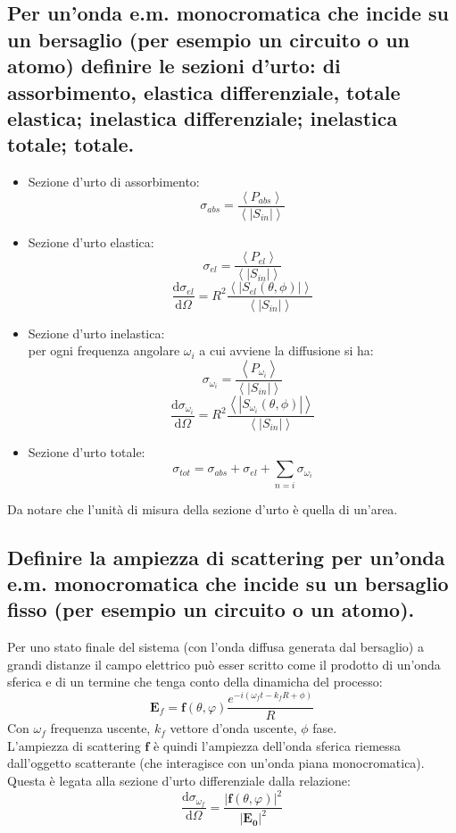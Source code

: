 \subsection[ Sezioni d'urto di onda E.M. su bersaglio]{Per un’onda e.m. monocromatica che incide su un bersaglio (per esempio un circuito o un atomo) definire le sezioni d’urto: di assorbimento, elastica differenziale, totale elastica; inelastica differenziale; inelastica totale; totale.}
\begin{itemize}
\item Sezione d'urto di assorbimento: 
	\[
		\sigma_{abs} = \frac{\left< P_{abs} \right> }{\left< \left|S_{in}\right| \right> }
	\] 	
\item Sezione d'urto elastica:
	\[
		\sigma_{el} = \frac{\left<P_{el} \right>}{\left< \left| S_{in} \right|  \right>} 
	\] 
	\[
		\frac{\mbox{d} \sigma_{el}}{\mbox{d} \Omega} = R^2 \frac{\left< \left| S_{el}\left( \theta,\phi \right)  \right|\right>}{ \left< \left| S_{in} \right|  \right> } 
	\] 
\item Sezione d'urto inelastica:\\
per ogni frequenza angolare $\omega_{i}$ a cui avviene la diffusione si ha:
\[
	\sigma_{\omega_{i}} = \frac{\left<P_{\omega_{i}} \right>}{\left< \left| S_{in} \right|  \right>} 
\] 
\[
	\frac{\mbox{d} \sigma_{\omega_{i}}}{\mbox{d} \Omega} = R^2 \frac{\left< \left| S_{\omega_{i}}\left( \theta,\phi \right)  \right|\right>}{ \left< \left| S_{in} \right|  \right> }
\] 
\item Sezione d'urto totale: 
	\[
	\sigma_{tot} = \sigma_{abs} + \sigma_{el} + \sum_{n=i} \sigma_{\omega_{i}}
	\] 
\end{itemize}
Da notare che l'unità di misura della sezione d'urto è quella di un'area.

\subsection[ Ampiezza di scattering]{Definire la ampiezza di scattering per un’onda e.m. monocromatica che incide su un bersaglio fisso (per esempio un circuito o un atomo).}
Per uno stato finale del sistema (con l'onda diffusa generata dal bersaglio) a grandi distanze il campo elettrico può esser scritto come il prodotto di un'onda sferica e di un termine che tenga conto della dinamicha del processo:
\[
	\boldsymbol{E}_{f} = \boldsymbol{f}\left( \theta, \varphi \right) \frac{e^{-i\left( \omega_{f}t - k_{f}R + \phi \right)}}{R}
\]
Con $\omega_{f}$ frequenza uscente, $k_{f}$ vettore d'onda uscente, $\phi$ fase.\\
L'ampiezza di scattering $\boldsymbol{f}$ è quindi l'ampiezza dell'onda sferica riemessa dall'oggetto scatterante (che interagisce con un'onda piana monocromatica). Questa è legata alla sezione d'urto differenziale dalla relazione:
\[
	\frac{\mbox{d} \sigma_{\omega_{f}}}{\mbox{d} \Omega} = \frac{\left| \boldsymbol{f}\left( \theta, \varphi \right) \right|^2}{\left| \boldsymbol{E_{0}} \right|^2 }
\] 


